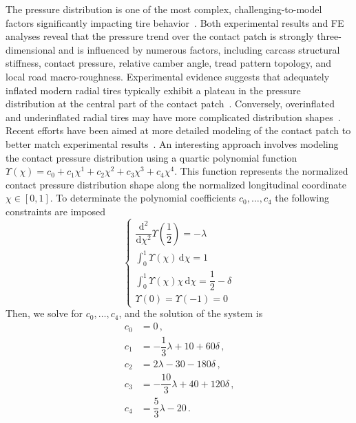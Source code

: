 The pressure distribution is one of the most complex, challenging-to-model factors significantly impacting tire behavior~\cite{savkoor1966some}. Both experimental results and \ac{FE} analyses reveal that the pressure trend over the contact patch is strongly three-dimensional and is influenced by numerous factors, including carcass structural stiffness, contact pressure, relative camber angle, tread pattern topology, and local road macro-roughness. Experimental evidence suggests that adequately inflated modern radial tires typically exhibit a plateau in the pressure distribution at the central part of the contact patch~\cite[Chapter~5]{nakajima2019advanced}. Conversely, overinflated and underinflated radial tires may have more complicated distribution shapes~\cite{nakajima2019advanced, sakai1995measurement}. Recent efforts have been aimed at more detailed modeling of the contact patch to better match experimental results~\cite{miyashita2010tire, fevrier2013method, xu2014analytical}. An interesting approach involves modeling the contact pressure distribution using a quartic polynomial function $\Upsilon(\chi) = c_0 + c_1\chi^1 + c_2\chi^2 + c_3\chi^3 + c_4\chi^4$. This function represents the normalized contact pressure distribution shape along the normalized longitudinal coordinate $\chi \in [0, 1]$. To determinate the polynomial coefficients $c_0, \dots, c_4$ the following constraints are imposed
%
\begin{equation}
  \begin{cases}
    \dfrac{\mathrm{d}^2}{\mathrm{d}\chi^2}\Upsilon\left(\dfrac{1}{2}\right) = -\lambda %
    \\[1.0em]
    \displaystyle\int_{0}^{1} \Upsilon(\chi)\,\mathrm{d}\chi = 1 %
    \\[1.0em]
    \displaystyle\int_{0}^{1} \Upsilon(\chi)\chi\,\mathrm{d}\chi = \dfrac{1}{2} - \delta %
    \\[1.0em]
    \Upsilon(0) = \Upsilon(-1) = 0 %
  \end{cases}
  \label{app3:eq:upsilon}
\end{equation}
%
Then, we solve for $c_0, \dots, c_4$, and the solution of the system is
%
\begin{align*}
  c_0 &= 0 \, \text{,} \\ %
  c_1 &= -\dfrac{1}{3}\lambda + 10 + 60\delta \, \text{,} \\ %
  c_2 &= 2\lambda - 30 - 180\delta \, \text{,} \\ %
  c_3 &= -\dfrac{10}{3}\lambda + 40 + 120\delta \, \text{,} \\ %
  c_4 &= \dfrac{5}{3}\lambda - 20 \, \text{.}
\end{align*}
